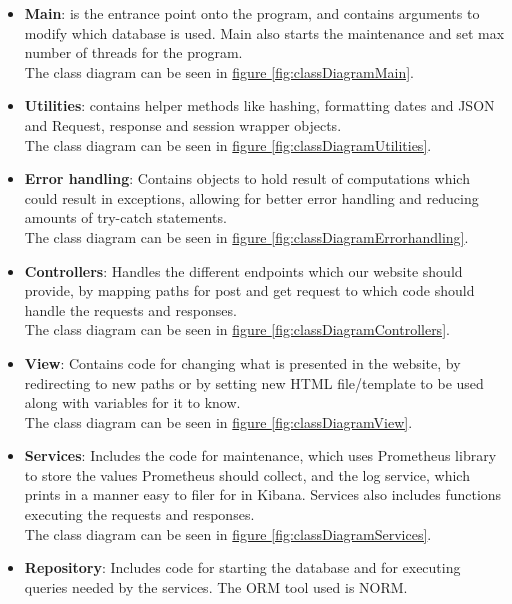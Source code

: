 \begin{itemize}
    \item \textbf{Main}: is the entrance point onto the program, and contains arguments to modify which database is used. Main also starts the maintenance and set max number of threads for the program.\\
    The class diagram can be seen in \hyperref[fig:classDiagramMain]{figure \ref{fig:classDiagramMain}}.
    \item \textbf{Utilities}: contains helper methods like hashing, formatting dates and JSON and Request, response and session wrapper objects. \\
    The class diagram can be seen in \hyperref[fig:classDiagramUtilities]{figure \ref{fig:classDiagramUtilities}}.
    \item \textbf{Error handling}: Contains objects to hold result of computations which could result in exceptions, allowing for better error handling and reducing amounts of try-catch statements. \\
    The class diagram can be seen in \hyperref[fig:classDiagramErrorhandling]{figure \ref{fig:classDiagramErrorhandling}}.
    \item \textbf{Controllers}: Handles the different endpoints which our website should provide, by mapping paths for post and get request to which code should handle the requests and responses.\\
    The class diagram can be seen in \hyperref[fig:classDiagramControllers]{figure \ref{fig:classDiagramControllers}}.
    \item \textbf{View}: Contains code for changing what is presented in the website, by redirecting to new paths or by setting new HTML file/template to be used along with variables for it to know.\\
    The class diagram can be seen in \hyperref[fig:classDiagramView]{figure \ref{fig:classDiagramView}}.
    \item \textbf{Services}: Includes the code for maintenance, which uses Prometheus library to store the values Prometheus should collect, and the log service, which prints in a manner easy to filer for in Kibana. Services also includes functions executing the requests and responses.\\
    The class diagram can be seen in \hyperref[fig:classDiagramServices]{figure \ref{fig:classDiagramServices}}.
    \item \textbf{Repository}: Includes code for starting the database and for executing queries needed by the services. The ORM tool used is NORM.  \\

\end{itemize}
